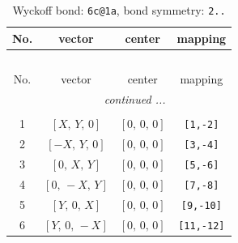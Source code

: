 \documentclass[fleqn,8pt]{jsarticle}
\begin{document}
\renewcommand{\arraystretch}{1.2}
\begin{longtable}{cccc}
\caption{Wyckoff bond: {\tt 6c@1a}, bond symmetry: {\tt 2..}}
 \\
 \hline \hline
No. & vector & center & mapping \\ \hline \endfirsthead

\multicolumn{3}{l}{\tablename\ \thetable{}} \\
 \hline \hline
No. & vector & center & mapping \\ \hline \endhead

 \hline \hline
\multicolumn{3}{r}{\footnotesize\it continued ...} \\ \endfoot

 \hline \hline
\multicolumn{3}{r}{} \\ \endlastfoot

1 & $\left[ X,\, Y,\, 0 \right]$ & $\left[ 0,\, 0,\, 0 \right]$ & {\tt [1,-2]} \\ \hline
2 & $\left[ - X,\, Y,\, 0 \right]$ & $\left[ 0,\, 0,\, 0 \right]$ & {\tt [3,-4]} \\ \hline
3 & $\left[ 0,\, X,\, Y \right]$ & $\left[ 0,\, 0,\, 0 \right]$ & {\tt [5,-6]} \\ \hline
4 & $\left[ 0,\, - X,\, Y \right]$ & $\left[ 0,\, 0,\, 0 \right]$ & {\tt [7,-8]} \\ \hline
5 & $\left[ Y,\, 0,\, X \right]$ & $\left[ 0,\, 0,\, 0 \right]$ & {\tt [9,-10]} \\ \hline
6 & $\left[ Y,\, 0,\, - X \right]$ & $\left[ 0,\, 0,\, 0 \right]$ & {\tt [11,-12]} \\
\end{longtable}
\renewcommand{\arraystretch}{1.2}
\end{document}
